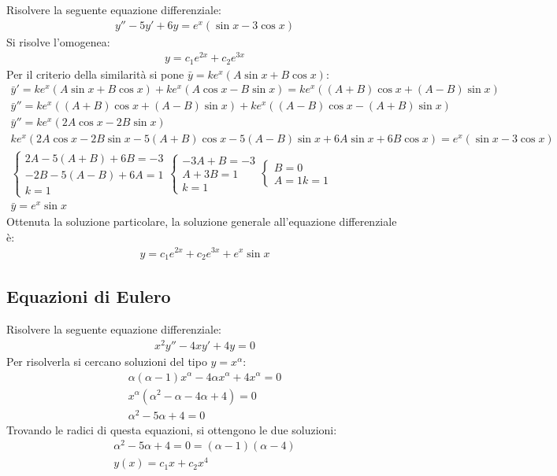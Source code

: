 \documentclass{article}
\numberwithin{equation}{subsection}
\begin{document}
Risolvere la seguente equazione differenziale:
\begin{gather*}
    y''-5y'+6y=e^x(\sin x-3\cos x)
\end{gather*}
Si risolve l'omogenea:
\begin{gather*}
    y=c_1e^{2x}+c_2e^{3x}
\end{gather*}
Per il criterio della similarità si pone $\bar{y}=ke^{x}(A\sin x+B\cos x)$:
\begin{gather*}
    \bar{y}'=ke^x(A\sin x+B\cos x)+ke^x(A\cos x-B\sin x)=ke^x((A+B)\cos x+(A-B)\sin x)\\
    \bar{y}''=ke^x((A+B)\cos x+(A-B)\sin x)+ke^x((A-B)\cos x-(A+B)\sin x)\\
    \bar{y}''=ke^x(2A\cos x-2B\sin x)\\
    ke^x(2A\cos x-2B\sin x-5(A+B)\cos x-5(A-B)\sin x+6A\sin x+6B\cos x)=e^x(\sin x-3\cos x)\\
    \begin{cases}
        2A-5(A+B)+6B=-3\\
        -2B-5(A-B)+6A=1\\
        k=1
    \end{cases}\begin{cases}
        -3A+B=-3\\
        A+3B=1\\
        k=1
    \end{cases}\begin{cases}
        B=0\\
        A=1
        k=1
    \end{cases}\\
    \bar{y}=e^x\sin x
\end{gather*}
Ottenuta la soluzione particolare, la soluzione generale all'equazione differenziale è:
\begin{gather*}
    y=c_1e^{2x}+c_2e^{3x}+e^x\sin x
\end{gather*}

\subsection{Equazioni di Eulero}

Risolvere la seguente equazione differenziale:
\begin{gather*}
    x^2y''-4xy'+4y=0
\end{gather*}
Per risolverla si cercano soluzioni del tipo $y=x^\alpha$:
\begin{gather*}
    \alpha(\alpha-1)x^{\alpha}-4\alpha x^\alpha+4x^\alpha=0\\
    x^\alpha\left(\alpha^2-\alpha-4\alpha+4\right)=0\\
    \alpha^2-5\alpha+4=0
\end{gather*}
Trovando le radici di questa equazioni, si ottengono le due soluzioni:
\begin{gather*}
    \alpha^2-5\alpha+4=0=(\alpha-1)(\alpha-4)\\
    y(x)=c_1x+c_2x^4
\end{gather*}
\end{document}
